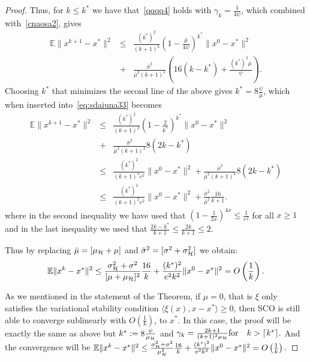 \documentclass{article}
\begin{document}
\begin{proof}
Thus, for $k \leq k^*$ we have that~\eqref{qqqq4} holds with $\gamma_k=\frac{1}{4 \psi}$, which combined with~\eqref{cnaosa2}, gives 
\begin{eqnarray}
 \mathbb{E}\| x^{k+1}-x^*\|^2 &\leq &
  \frac{(k^*)^2}{(k+1)^2 } \left( 1 -  \frac{\bar{\mu}}{4 \psi} \right)^{k^*} \|x^{0}-x^*\|^2 \nonumber \\ &   
  +&\frac{\bar{\sigma}^2 }{\bar{\mu}^2 (k+1)^2}\left(16 (k-k^*) +   \frac{(k^*)^2 \bar{\mu}}{\psi } \right).  \label{eq:sdaiuna33}
\end{eqnarray}
Choosing $k^*$ that minimizes the second line of the above gives $k^* = 8 \frac{\psi}{\bar{\mu}} $, which when inserted into~\eqref{eq:sdaiuna33} becomes
\begin{eqnarray}
 \mathbb{E}\| x^{k+1}-x^*\|^2 &\leq &
  \frac{(k^*)^2}{(k+1)^2 } \left( 1 -  \frac{2}{k^*} \right)^{k^*} \|x^{0}-x^*\|^2 \nonumber \\ &   
  +&\frac{\bar{\sigma}^2 }{\bar{\mu}^2 (k+1)^2}8 \left(2k- k^* \right)\nonumber \\
  & \leq &  \frac{(k^*)^2}{(k+1)^2 e^2} \|x^{0}-x^*\|^2  +  \frac{\bar{\sigma}^2 }{\bar{\mu}^2 (k+1)^2}8 \left(2k- k^* \right)\nonumber \\
  & \leq &  \frac{(k^*)^2}{(k+1)^2 e^2} \|x^{0}-x^*\|^2  +  \frac{\bar{\sigma}^2 }{\bar{\mu}^2} \frac{16}{k+1}.
\end{eqnarray}
where in the second inequality we have used that $\left( 1 -  \frac{1}{2x} \right)^{4x} \leq \frac{1}{e^2}$  for all $x \geq 1$ and in the last inequality we used that
$\frac{2 k-k^*}{k+1} \leq \frac{2 k}{k+1}  \leq 2. $

Thus by replacing $\bar{\mu}= [\mu_{{\cal H}} + \mu]$ and $\bar{\sigma}^2=[\sigma^2 + \sigma_{{\cal H}}^2]$ we obtain:
$$\mathbb{E}\| x^{k} - x^*\|^2 \le   \frac{\sigma_{{\cal H}}^2 +\sigma^2}{[\mu + \mu_{{\cal H}}]^2}\frac{16 }{k} + \frac{(k^*)^2 }{e^2 k^2}  \|x^0 - x^*\|^2 = O\left(\frac{1}{k}\right).$$

As we mentioned in the statement of the Theorem, if $\mu=0$, that is $\xi$ only satisfies the variational stability condition $\langle\xi(x),x-x^*\rangle \geq0$, then SCO is still able to converge sublinearly with $O\left(\frac{1}{k}\right)$, to $x^*$. In this case, the proof will be exactly the same as above but $k^*:= 8 \frac{\psi}{\mu_{{\cal H}}}$ and $\gamma_k=\frac{2k+1}{(k+1)^2 \mu_{{\cal H}}} \text{for} \quad k >  \lceil k^* \rceil.$ And the convergence will be 
$
\mathbb{E}\| x^{k} - x^*\|^2 \le   \frac{\sigma_{{\cal H}}^2 +\sigma^2}{\mu_{{\cal H}}^2}\frac{16 }{k} + \frac{(k^*)^2 }{e^2 k^2}  \|x^0 - x^*\|^2 = O\left(\frac{1}{k}\right).
$
\end{proof}
\newpage
\end{document}
